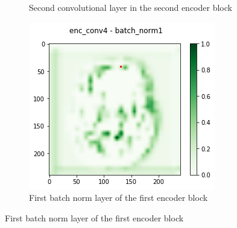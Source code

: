 \begin{figure}[H]
\begin{subfigure}{.33\textwidth}
        \caption{Second convolutional layer in the second encoder block}
    \end{subfigure}%
        \begin{subfigure}{.33\textwidth}
        \centering
        \includegraphics[width=\linewidth]{chapters/04_segmentation/images/grad_cam_14.png}
        \caption{First batch norm layer of the first encoder block}
    \end{subfigure}


\end{figure}
